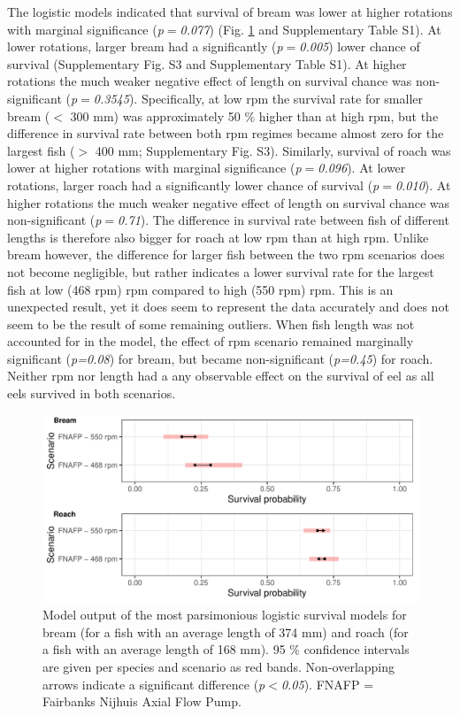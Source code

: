 \documentclass[fleqn,10pt]{wlscirep}
\begin{document}
The logistic models indicated that survival of bream was lower at higher rotations with marginal significance (\textit{p$=$0.077}) (Fig. \ref{fig:log_model_CI} and Supplementary Table S1). At lower rotations, larger bream had a significantly (\textit{p$=$0.005}) lower chance of survival (Supplementary Fig. S3 and Supplementary Table S1). At higher rotations the much weaker negative effect of length on survival chance was non-significant (\textit{p$=$0.3545}). Specifically, at low rpm the survival rate for smaller bream ($<$ 300 mm) was approximately 50 \% higher than at high rpm, but the difference in survival rate between both rpm regimes became almost zero for the largest fish ($>$ 400 mm; Supplementary Fig. S3). Similarly, survival of roach was lower at higher rotations with marginal significance (\textit{p$=$0.096}). At lower rotations, larger roach had a significantly lower chance of survival (\textit{p$=$0.010}). At higher rotations the much weaker negative effect of length on survival chance was non-significant (\textit{p$=$0.71}). The difference in survival rate between fish of different lengths is therefore also bigger for roach at low rpm than at high rpm. Unlike bream however, the difference for larger fish between the two rpm scenarios does not become negligible, but rather indicates a lower survival rate for the largest fish at low (468 rpm) rpm compared to high (550 rpm) rpm. This is an unexpected result, yet it does seem to represent the data accurately and does not seem to be the result of some remaining outliers. When fish length was not accounted for in the model, the effect of rpm scenario remained marginally significant (\textit{p=0.08}) for bream, but became non-significant (\textit{p=0.45}) for roach. Neither rpm nor length had a any observable effect on the survival of eel as all eels survived in both scenarios.

\begin{figure}[ht]
  \centering
  \includegraphics[scale=0.65]{log_model_CI}
  \caption{Model output of the most parsimonious logistic survival models for bream (for a fish with an average length of 374 mm) and roach (for a fish with an average length of 168 mm). 95 \% confidence intervals are given per species and scenario as red bands. Non-overlapping arrows indicate a significant difference (\textit{p$<$0.05}). FNAFP = Fairbanks Nijhuis Axial Flow Pump.}
  \label{fig:log_model_CI}
\end{figure}
\end{document}
